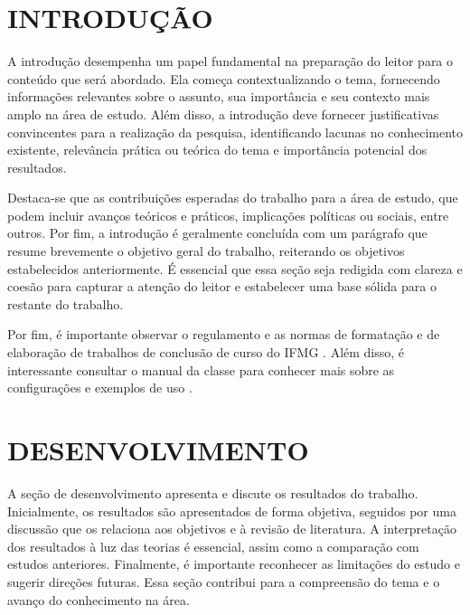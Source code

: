 \documentclass{iftex2024}
\begin{document}
\maketitle

\chapter{INTRODUÇÃO}

A introdução desempenha um papel fundamental na preparação do leitor para o conteúdo que será abordado.
Ela começa contextualizando o tema, fornecendo informações relevantes sobre o assunto, sua importância e seu contexto mais amplo na área de estudo.
Além disso, a introdução deve fornecer justificativas convincentes para a realização da pesquisa, identificando lacunas no conhecimento existente, relevância prática ou teórica do tema e importância potencial dos resultados.

Destaca-se que as contribuições esperadas do trabalho para a área de estudo, que podem incluir avanços teóricos e práticos, implicações políticas ou sociais, entre outros.
Por fim, a introdução é geralmente concluída com um parágrafo que resume brevemente o objetivo geral do trabalho, reiterando os objetivos estabelecidos anteriormente.
É essencial que essa seção seja redigida com clareza e coesão para capturar a atenção do leitor e estabelecer uma base sólida para o restante do trabalho.

Por fim, é importante observar o regulamento e as normas de formatação e de elaboração de trabalhos de conclusão de curso do IFMG \cite{ifmg:2020:manual,ifmg:2021:tcc}.
Além disso, é interessante consultar o manual da classe \iftex para conhecer mais sobre as configurações e exemplos de uso \cite{ribeiro:2024:iftex}.

\chapter{DESENVOLVIMENTO}

A seção de desenvolvimento apresenta e discute os resultados do trabalho.
Inicialmente, os resultados são apresentados de forma objetiva, seguidos por uma discussão que os relaciona aos objetivos e à revisão de literatura.
A interpretação dos resultados à luz das teorias é essencial, assim como a comparação com estudos anteriores.
Finalmente, é importante reconhecer as limitações do estudo e sugerir direções futuras.
Essa seção contribui para a compreensão do tema e o avanço do conhecimento na área.
\end{document}
